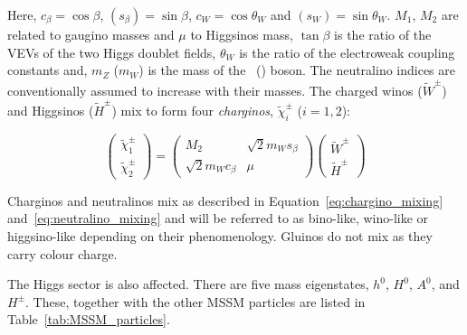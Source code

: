 				\noindent Here, $c_{\beta} = \cos \beta$,  $(s_{\beta}) = \sin \beta$, $c_W = \cos \theta_W$ and $(s_W) = \sin \theta_W$. $M_1$, $M_2$ are related to gaugino masses and $\mu$ to Higgsinos mass, $\tan \beta$ is the ratio of the \ac{VEV}s of the two Higgs doublet fields, $\theta_W$ is the ratio of the electroweak coupling constants and, $m_Z$ ($m_W$) is the mass of the \Zboson\ (\Wboson) boson. The neutralino indices are conventionally assumed to increase with their masses. The charged winos ($\tilde{W}^{\pm}$) and Higgsinos ($\tilde{H}^{\pm}$) mix to form four \textit{charginos}, $\tilde{\chi}^{\pm}_i$ ($i=1,2$):

				\begin{equation}
				\label{eq:chargino_mixing}
						\begin{pmatrix}  \tilde{\chi}^{\pm}_1 \\ \tilde{\chi}^{\pm}_2 \end{pmatrix}	
						= 
						\begin{pmatrix}
							M_2 & \sqrt{2} m_W s_\beta \\
							\sqrt{2} m_W c_\beta & \mu  
						\end{pmatrix}
						\begin{pmatrix}
							\tilde{W}^{\pm} \\
							\tilde{H}^{\pm}
						\end{pmatrix}
				\end{equation}

				Charginos and neutralinos mix as described in Equation~\ref{eq:chargino_mixing} and~\ref{eq:neutralino_mixing} and will be referred to as bino-like, wino-like or higgsino-like depending on their phenomenology. Gluinos do not mix as they carry colour charge. 

				The Higgs sector is also affected. There are five mass eigenstates, $h^0$, $H^0$, $A^0$, and $H^{\pm}$. These, together with the other \ac{MSSM} particles are listed in Table~\ref{tab:MSSM_particles}. 
				
